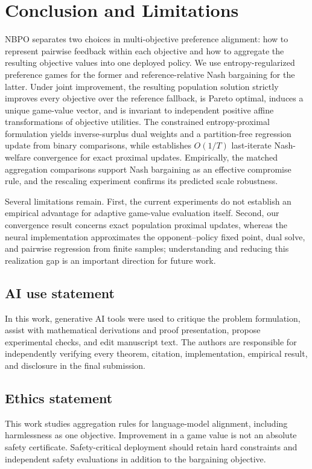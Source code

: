 \documentclass{article}
\theoremstyle{remark}
\theoremstyle{plain}
\newcommand{\NBPO}{\textsc{NBPO}}
\begin{document}
\section{Conclusion and Limitations}
\label{sec:conclusion}
\NBPO{} separates two choices in multi-objective preference alignment: how to represent pairwise feedback within each objective and how to aggregate the resulting objective values into one deployed policy. We use entropy-regularized preference games for the former and reference-relative Nash bargaining for the latter. Under joint improvement, the resulting population solution strictly improves every objective over the reference fallback, is Pareto optimal, induces a unique game-value vector, and is invariant to independent positive affine transformations of objective utilities. The constrained entropy-proximal formulation yields inverse-surplus dual weights and a partition-free regression update from binary comparisons, while  establishes $O(1/T)$ last-iterate Nash-welfare convergence for exact proximal updates. Empirically, the matched aggregation comparisons support Nash bargaining as an effective compromise rule, and the rescaling experiment confirms its predicted scale robustness.

Several limitations remain. First, the current experiments do not establish an empirical advantage for adaptive game-value evaluation itself. Second, our convergence result concerns exact population proximal updates, whereas the neural implementation approximates the opponent--policy fixed point, dual solve, and pairwise regression from finite samples; understanding and reducing this realization gap is an important direction for future work. 

\subsection*{AI use statement}
In this work, generative AI tools were used to critique the problem formulation, assist with mathematical derivations and proof presentation, propose experimental checks, and edit manuscript text. The authors are responsible for independently verifying every theorem, citation, implementation, empirical result, and disclosure in the final submission.

\subsection*{Ethics statement}
This work studies aggregation rules for language-model alignment, including harmlessness as one objective. Improvement in a game value is not an absolute safety certificate. Safety-critical deployment should retain hard constraints and independent safety evaluations in addition to the bargaining objective.
\end{document}
